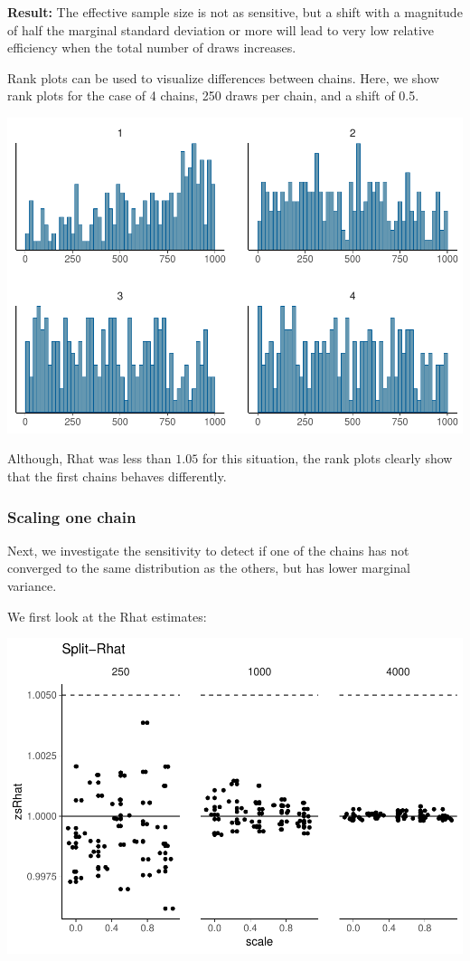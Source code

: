 \documentclass[american,]{article}
\begin{document}
\textbf{Result:} The effective sample size is not as sensitive, but a
shift with a magnitude of half the marginal standard deviation or more
will lead to very low relative efficiency when the total number of draws
increases.

Rank plots can be used to visualize differences between chains. Here, we
show rank plots for the case of 4 chains, 250 draws per chain, and a
shift of 0.5.

\includegraphics{graphics/hist-shifted-chain-1.pdf}

Although, Rhat was less than \(1.05\) for this situation, the rank plots
clearly show that the first chains behaves differently.

\hypertarget{scaling-one-chain}{%
\subsubsection*{Scaling one chain}\label{scaling-one-chain}}

Next, we investigate the sensitivity to detect if one of the chains has
not converged to the same distribution as the others, but has lower
marginal variance.

We first look at the Rhat estimates:

\includegraphics{graphics/zsrhat-scaled-chain-1.pdf}
\end{document}
